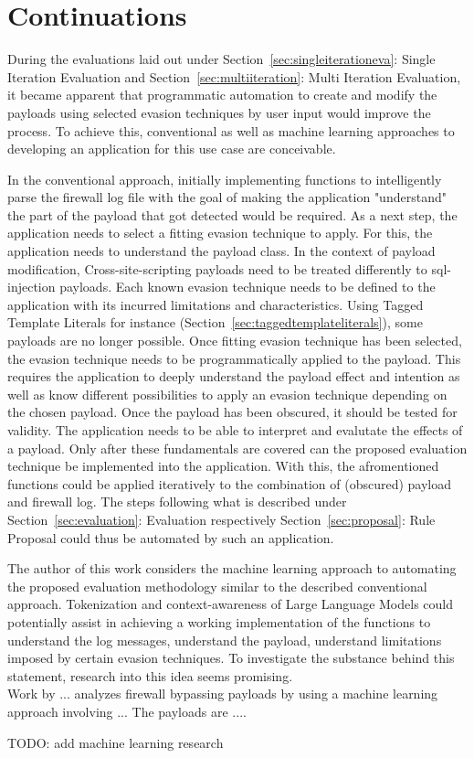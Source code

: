 \section{Continuations}
\label{sec:continuations}
During the evaluations laid out under Section~\ref{sec:singleiterationeva}: Single Iteration Evaluation and Section~\ref{sec:multiiteration}: Multi Iteration Evaluation, it became apparent that programmatic automation to create and modify the payloads using selected evasion techniques by user input would improve the process. To achieve this, conventional as well as machine learning approaches to developing an application for this use case are conceivable.

In the conventional approach, initially implementing functions to intelligently parse the firewall log file with the goal of making the application "understand" the part of the payload that got detected would be required. As a next step, the application needs to select a fitting evasion technique to apply. For this, the application needs to understand the payload class. In the context of payload modification, Cross-site-scripting payloads need to be treated differently to sql-injection payloads. Each known evasion technique needs to be defined to the application with its incurred limitations and characteristics. Using Tagged Template Literals for instance (Section~\ref{sec:taggedtemplateliterals}), some payloads are no longer possible.
Once fitting evasion technique has been selected, the evasion technique needs to be programmatically applied to the payload. This requires the application to deeply understand the payload effect and intention as well as know different possibilities to apply an evasion technique depending on the chosen payload. Once the payload has been obscured, it should be tested for validity. The application needs to be able to interpret and evalutate the effects of a payload. Only after these fundamentals are covered can the proposed evaluation technique be implemented into the application. With this, the afromentioned functions could be applied iteratively to the combination of (obscured) payload and firewall log. The steps following what is described under Section~\ref{sec:evaluation}: Evaluation respectively Section~\ref{sec:proposal}: Rule Proposal could thus be automated by such an application. 

The author of this work considers the machine learning approach to automating the proposed evaluation methodology similar to the described conventional approach. Tokenization and context-awareness of Large Language Models could potentially assist in achieving a working implementation of the functions to understand the log messages, understand the payload, understand limitations imposed by certain evasion techniques. To investigate the substance behind this statement, research into this idea seems promising. \\ 
Work by ...  analyzes firewall bypassing payloads by using a machine learning approach involving ... The payloads are ....

{\color{red} TODO: add machine learning research}

